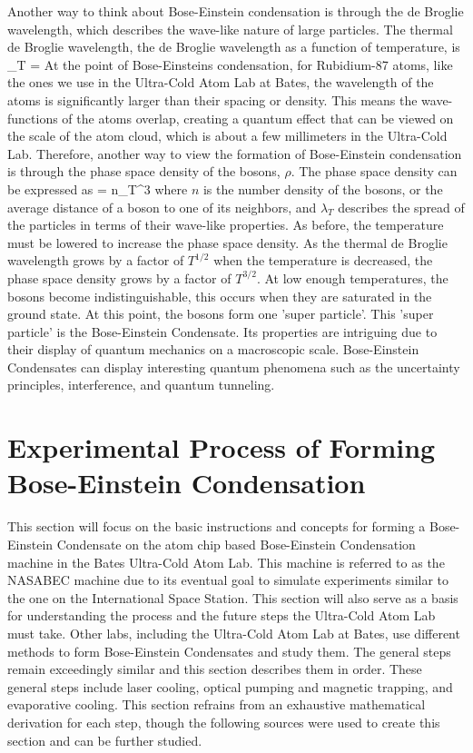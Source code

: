 Another way to think about Bose-Einstein condensation is through the de Broglie wavelength, which describes the wave-like nature of large particles. The thermal de Broglie wavelength, the de Broglie wavelength as a function of temperature, is
\beq 
\lambda_{T} = 
\eeq
At the point of Bose-Einsteins condensation, for Rubidium-87 atoms, like the ones we use in the Ultra-Cold Atom Lab at Bates, the wavelength of the atoms is significantly larger than their spacing or density. This means the wave-functions of the atoms overlap, creating a quantum effect that can be viewed on the scale of the atom cloud, which is about a few millimeters in the Ultra-Cold Lab. Therefore, another way to view the formation of Bose-Einstein condensation is through the phase space density of the bosons, $\rho$. The phase space density can be expressed as
\beq
\rho = n\lambda_T^3
\eeq
where $n$ is the number density of the bosons, or the average distance of a boson to one of its neighbors, and $\lambda_T$ describes the spread of the particles in terms of their wave-like properties. As before, the temperature must be lowered to increase the phase space density. As the thermal de Broglie wavelength grows by a factor of $T^{1/2}$ when the temperature is decreased, the phase space density grows by a factor of $T^{3/2}$. At low enough temperatures, the bosons become indistinguishable, this occurs when they are saturated in the ground state. At this point, the bosons form one 'super particle'. This 'super particle' is the Bose-Einstein Condensate. Its properties are intriguing due to their display of quantum mechanics on a macroscopic scale. Bose-Einstein Condensates can display interesting quantum phenomena such as the uncertainty principles, interference, and quantum tunneling.
\newline



\section{Experimental Process of Forming Bose-Einstein Condensation}

This section will focus on the basic instructions and concepts for forming a Bose-Einstein Condensate on the atom chip based Bose-Einstein Condensation machine in the Bates Ultra-Cold Atom Lab. This machine is referred to as the NASABEC machine due to its eventual goal to simulate experiments similar to the one on the International Space Station. This section will also serve as a basis for understanding the process and the future steps the Ultra-Cold Atom Lab must take. Other labs, including the Ultra-Cold Atom Lab at Bates, use different methods to form Bose-Einstein Condensates and study them. The general steps remain exceedingly similar and this section describes them in order. These general steps include laser cooling, optical pumping and magnetic trapping, and evaporative cooling. This section refrains from an exhaustive mathematical derivation for each step, though the following sources were used to create this section and can be further studied\cite{foot}\cite{metcalf_article}\cite{LCandT}.
\newline


